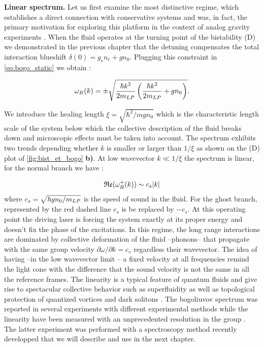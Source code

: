 \bigskip

\textbf{Linear spectrum.}
Let us first examine the most distinctive regime, which establishes a direct connection with conservative systems and was, in fact, the primary motivation for exploring this platform in the context of analog gravity experiments \cite{claude_high-resolution_2022}.
When the fluid operates at the turning point of the bistability (D) we demonstrated in the previous chapter that the detuning compensates the total interaction blueshift $\delta(0)=g_rn_r + gn_0$. 
Plugging this constraint in \autoref{eq:bogo_static} we obtain :

\begin{equation}
    \omega_B(k) = \pm \sqrt{\dfrac{\hbar k^2}{2m_{LP}} \left({\dfrac{\hbar k^2}{2m_{LP}}} + g n_0 \right)}.
\end{equation}

We introduce the healing length $\xi=\sqrt{\hbar^2/mgn_0}$ which is the characteristic length scale of the system below which the collective description of the fluid breaks down and microscopic effects
must be taken into account. The spectrum exhibits two trends depending whether $k$ is smaller or larger than $1/\xi$ as shown on the (D) plot of \autoref{fig:bist_et_bogo} \textbf{b)}. At low wavevector $k \ll 1/ \xi$ the spectrum is linear, for the normal branch we have :

\begin{equation}
    \mathfrak{Re}(\omega^+_B(k)) \sim c_s\abs{k}
\end{equation}
where $c_s = \sqrt{\hbar g n_0/m_{LP}}$ is the speed of sound in the fluid. For the ghost branch, represented by the red dashed line $c_s$ is be replaced by $-c_s$. At this operating point the driving laser is forcing the system exactly at its proper energy and 
doesn't fix the phase of the excitations. In this regime, the long range interactions are dominated by collective deformation of the fluid --phonons-- that propagate with the same group velocity $\partial\omega/\partial k =c_s$ regardless their wavevector. 
The idea of having --in the low wavevector limit -- a fixed velocity at all frequencies remind the light cone with the difference that the sound velocity is not the same in all the reference frames.
The linearity is a typical feature of quantum fluids and give rise to spectacular collective behavior such as superfluidity \cite{Amo_fluidlightexp_2009} as well as topological protection of quantized vortices and dark solitons \cite{maitre_thesis}.
The bogoliuvov spectrum was reported in several experiments \cite{utsunomiya_observation_2008,stepanov_dispersion_2019} with different experimental methods while the linearity have been measured with 
an unprecedented resolution in the group \cite{claude_high-resolution_2022}. The latter experiment was performed with a spectroscopy method recently developped \cite{claude_prb} that we will describe and use in the next chapter.


